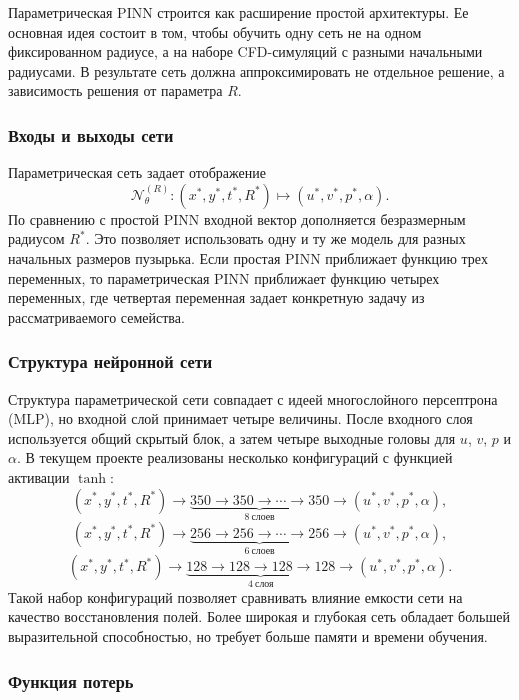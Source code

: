 \documentclass[12pt,a4paper]{article}
\begin{document}
Параметрическая PINN строится как расширение простой архитектуры. Ее основная
идея состоит в том, чтобы обучить одну сеть не на одном фиксированном радиусе,
а на наборе CFD-симуляций с разными начальными радиусами. В результате сеть
должна аппроксимировать не отдельное решение, а зависимость решения от
параметра \(R\).

\subsubsection{Входы и выходы сети}

Параметрическая сеть задает отображение
\[
    \mathcal{N}_{\theta}^{(R)}:
    (x^*,y^*,t^*,R^*)\mapsto (u^*,v^*,p^*,\alpha).
\]
По сравнению с простой PINN входной вектор дополняется безразмерным радиусом
\(R^*\). Это позволяет использовать одну и ту же модель для разных начальных
размеров пузырька. Если простая PINN приближает функцию трех переменных, то
параметрическая PINN приближает функцию четырех переменных, где четвертая
переменная задает конкретную задачу из рассматриваемого семейства.

\subsubsection{Структура нейронной сети}

Структура параметрической сети совпадает с идеей многослойного персептрона (MLP), но входной слой
принимает четыре величины. После входного слоя используется общий скрытый блок,
а затем четыре выходные головы для \(u\), \(v\), \(p\) и \(\alpha\). В текущем
проекте реализованы несколько конфигураций с функцией активации \(\tanh\):
\[
    (x^*,y^*,t^*,R^*) \rightarrow
    \underbrace{350 \rightarrow 350 \rightarrow \cdots \rightarrow 350}_{8\ \text{слоев}}
    \rightarrow
    (u^*,v^*,p^*,\alpha),
\]
\[
    (x^*,y^*,t^*,R^*) \rightarrow
    \underbrace{256 \rightarrow 256 \rightarrow \cdots \rightarrow 256}_{6\ \text{слоев}}
    \rightarrow
    (u^*,v^*,p^*,\alpha),
\]
\[
    (x^*,y^*,t^*,R^*) \rightarrow
    \underbrace{128 \rightarrow 128 \rightarrow 128 \rightarrow 128}_{4\ \text{слоя}}
    \rightarrow
    (u^*,v^*,p^*,\alpha).
\]
Такой набор конфигураций позволяет сравнивать влияние емкости сети на качество
восстановления полей. Более широкая и глубокая сеть обладает большей
выразительной способностью, но требует больше памяти и времени обучения.

\subsubsection{Функция потерь}
\end{document}
